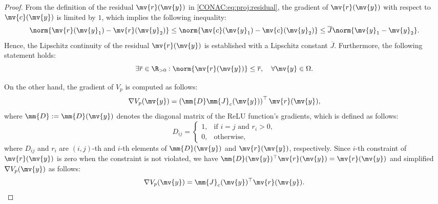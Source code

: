 \begin{proof}

  From the definition of the residual $\mv{r}(\mv{y})$ in \eqref{CONAC:eq:proj:residual}, the gradient of $\mv{r}(\mv{y})$ with respect to $\mv{c}(\mv{y})$ is limited by $1$, which implies the following inequality:
  \begin{equation}
    \norm{\mv{r}(\mv{y}_1) - \mv{r}(\mv{y}_2)}
    \le
    \norm{\mv{c}(\mv{y}_1) - \mv{c}(\mv{y}_2)}
    \le
    \overline{J}\norm{\mv{y}_1-\mv{y}_2}
    .
  \end{equation}
  Hence, the Lipschitz continuity of the residual $\mv{r}(\mv{y})$ is established with a Lipschitz constant $\overline{J}$.
  Furthermore, the following statement holds:
  \begin{equation}
    \exists \overline{r}\in\R_{>0}
    :
    \norm{\mv{r}(\mv{y})}\le\overline{r}
    ,
    \quad
    \forall \mv{y}\in\Omega
    .
  \end{equation}

  \par\medskip

  On the other hand, the gradient of $V_p$ is computed as follows:
  \begin{equation}
    \nabla V_p(\mv{y})
    =
    \left(\mm{D}\mm{J}_c(\mv{y})\right)^\top
    \mv{r}(\mv{y})
    ,
  \end{equation}
  where $\mm{D}:=\mm{D}(\mv{y})$ denotes the diagonal matrix of the ReLU function's gradients, which is defined as follows:
  \begin{equation}
    \label{CONAC:eq:proj:Vp:grad:ReLU}
    D_{ij}
    =
    \begin{cases}
      1, & \text{if } i=j \text{ and } r_i>0 
      ,
      \\
      0, & \text{otherwise}
      ,
    \end{cases}
  \end{equation}
  where $D_{ij}$ and $r_i$ are $(i,j)$-th and $i$-th elements of $\mm{D}(\mv{y})$ and $\mv{r}(\mv{y})$, respectively.
  Since $i$-th constraint of $\mv{r}(\mv{y})$ is zero when the constraint is not violated, we have $\mm{D}(\mv{y})^\top\mv{r}(\mv{y}) = \mv{r}(\mv{y})$ and simplified $\nabla V_p(\mv{y})$ as follows:
  \begin{equation}
    \label{CONAC:eq:proj:Vp:grad:simple}
    \nabla V_p(\mv{y})
    =
    \mm{J}_c(\mv{y})^\top
    \mv{r}(\mv{y})
    .
  \end{equation}
  

\end{proof}
